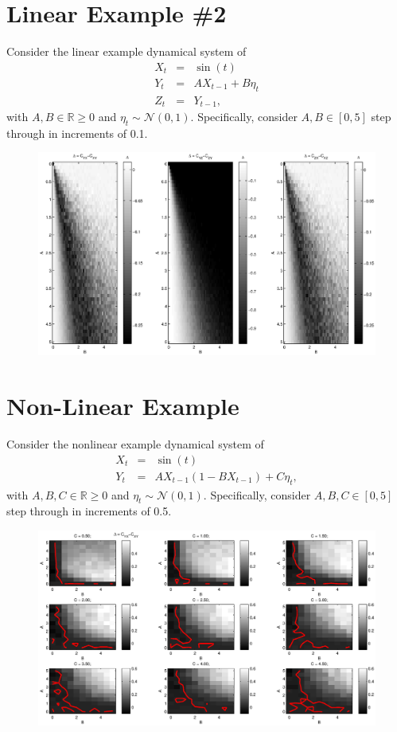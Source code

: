 \documentclass{article}
\begin{document}
\section{Linear Example \#2}
Consider the linear example dynamical system of
\begin{eqnarray}
X_t &=& \sin(t)\\
Y_t &=& AX_{t-1}+B\eta_t\\
Z_t &=& Y_{t-1},
\end{eqnarray}
with $A,B\in\mathbb{R}\ge 0$ and $\eta_t\sim\mathcal{N}\left(0,1\right)$.  Specifically, consider $A,B\in[0,5]$ step through in increments of 0.1.    
\begin{figure}[H]
\includegraphics[scale=0.6]{LinearXYZEx.eps} \\
\caption{}
\label{fig2}
\end{figure}

\section{Non-Linear Example}
Consider the nonlinear example dynamical system of
\begin{eqnarray}
X_t &=& \sin(t)\\
Y_t &=& AX_{t-1}\left(1-BX_{t-1}\right)+C\eta_t,
\end{eqnarray}
with $A,B,C\in\mathbb{R}\ge 0$ and $\eta_t\sim\mathcal{N}\left(0,1\right)$.  Specifically, consider $A,B,C\in[0,5]$ step through in increments of 0.5.    
\begin{figure}[H]
\includegraphics[scale=0.6]{NonLinearEx.eps} \\
\caption{}
\label{fig2}
\end{figure}
\end{document}
